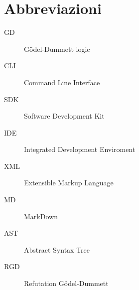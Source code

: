 \documentclass[\main/tesi.tex]{subfiles}
\begin{document}
\chapter{Abbreviazioni}

\begin{description}
    \item[GD] G\"odel-Dummett logic
    \item[CLI] Command Line Interface
    \item[SDK] Software Development Kit
    \item[IDE] Integrated Development Enviroment
    \item[XML] Extensible Markup Language
    \item[MD] MarkDown
    \item[AST] Abstract Syntax Tree
    \item[RGD] Refutation G\"odel-Dummett
\end{description}
\end{document}
